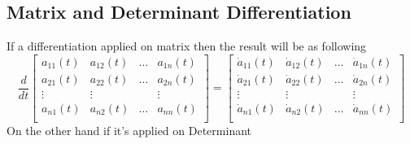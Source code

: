 \subsection{Matrix and Determinant Differentiation}
If a differentiation applied on matrix then the result will be as following
\[
    \frac{d}{dt} \begin{bmatrix}
        a_{11}(t) & a_{12}(t) & \dots & a_{1n}(t) \\
        a_{21}(t) & a_{22}(t) & \dots & a_{2n}(t) \\
        \vdots    & \vdots    &       & \vdots    \\
        a_{n1}(t) & a_{n2}(t) & \dots & a_{nn}(t) \\
    \end{bmatrix}
    =
    \begin{bmatrix}
        \dot{a}_{11}(t) & \dot{a}_{12}(t) & \dots & \dot{a}_{1n}(t) \\
        \dot{a}_{21}(t) & \dot{a}_{22}(t) & \dots & \dot{a}_{2n}(t) \\
        \vdots          & \vdots          &       & \vdots          \\
        \dot{a}_{n1}(t) & \dot{a}_{n2}(t) & \dots & \dot{a}_{nn}(t) \\
    \end{bmatrix}
\]
On the other hand if it's applied on Determinant

